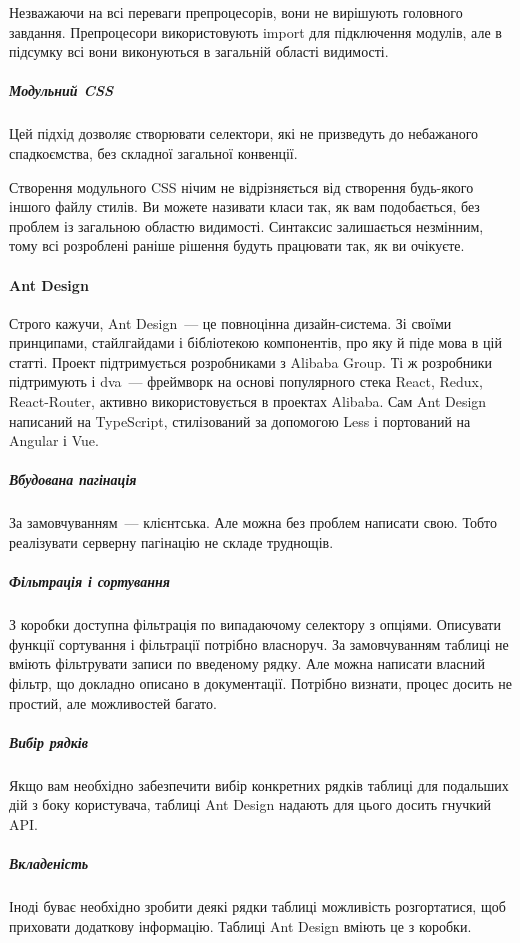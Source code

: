 Незважаючи на всі переваги препроцесорів, вони не вирішують головного завдання. Препроцесори використовують import для підключення модулів, але в підсумку всі вони виконуються в загальній області видимості.

\subparagraph{Модульний CSS}

Цей підхід дозволяє створювати селектори, які не призведуть до небажаного спадкоємства, без складної загальної конвенції.

Створення модульного CSS нічим не відрізняється від створення будь-якого іншого файлу стилів. Ви можете називати класи так, як вам подобається, без проблем із загальною областю видимості. Синтаксис залишається незмінним, тому всі розроблені раніше рішення будуть працювати так, як ви очікуєте.

\paragraph{Ant Design}

Строго кажучи, Ant Design~--- це повноцінна дизайн-система. Зі своїми принципами, стайлгайдами і бібліотекою компонентів, про яку й піде мова в цій статті. Проект підтримується розробниками з Alibaba Group. Ті ж розробники підтримують і dva~--- фреймворк на основі популярного стека React, Redux, React-Router, активно використовується в проектах Alibaba. Сам Ant Design написаний на TypeScript, стилізований за допомогою Less і портований на Angular і Vue.

\subparagraph{Вбудована пагінація}
За замовчуванням~--- клієнтська. Але можна без проблем написати свою. Тобто реалізувати серверну пагінацію не складе труднощів.

\subparagraph{Фільтрація і сортування}
З коробки доступна фільтрація по випадаючому селектору з опціями. Описувати функції сортування і фільтрації потрібно власноруч. За замовчуванням таблиці не вміють фільтрувати записи по введеному рядку. Але можна написати власний фільтр, що докладно описано в документації. Потрібно визнати, процес досить не простий, але можливостей багато.

\subparagraph{Вибір рядків}
Якщо вам необхідно забезпечити вибір конкретних рядків таблиці для подальших дій з боку користувача, таблиці Ant Design надають для цього досить гнучкий API.

\subparagraph{Вкладеність}
Іноді буває необхідно зробити деякі рядки таблиці можливість розгортатися, щоб приховати додаткову інформацію. Таблиці Ant Design вміють це з коробки.

